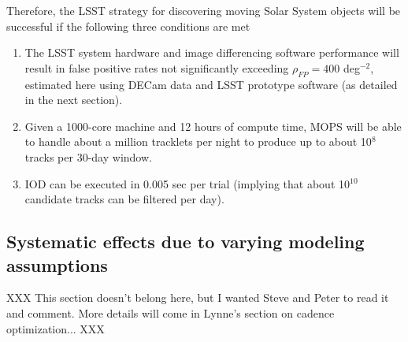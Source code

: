 Therefore, the LSST strategy for discovering moving Solar System objects will be successful
 if the following three conditions are met
\begin{enumerate}
\item The LSST system hardware and image differencing software performance will result in false positive 
          rates not significantly exceeding $\rho_{FP} =  400$ deg$^{-2}$, estimated here using DECam data
          and LSST prototype software (as detailed in the next section). 
\item Given a 1000-core machine and 12 hours of compute time, MOPS will be able to handle about 
          a million tracklets per night to produce up to about 10$^8$ tracks per 30-day window. 
\item IOD can be executed in 0.005 sec per trial (implying that about 10$^{10}$ candidate tracks can
          be filtered per day). 
\end{enumerate}




\subsection{Systematic effects due to varying modeling assumptions}

XXX This section doesn't belong here, but I wanted Steve and Peter to read it and comment. 
More details will come in Lynne's section on cadence optimization... XXX


